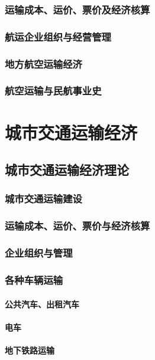 \documentclass[UTF8]{../../RepresentationUniverse}
\begin{document}
    \subsection{运输成本、运价、票价及经济核算}
    \subsection{航运企业组织与经营管理}
    \subsection{地方航空运输经济}
    \subsection{航空运输与民航事业史}



\chapter{城市交通运输经济}
\section{城市交通运输经济理论}
    \subsection{城市交通运输建设}
    \subsection{运输成本、运价、票价与经济核算}
    \subsection{企业组织与管理}
    \subsection{各种车辆运输}
        \subsubsection{公共汽车、出租汽车}
        \subsubsection{电车}
        \subsubsection{地下铁路运输}
\end{document}

